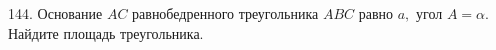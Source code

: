 144. Основание $AC$ равнобедренного треугольника $ABC$ равно $a,$ угол $A=\alpha.$ Найдите площадь треугольника.\\
